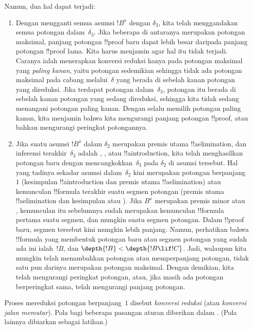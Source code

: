 \documentclass[../../../include/open-logic-section]{subfiles}
\begin{document}
Namun, dua hal dapat terjadi:
\begin{enumerate}
  \item Dengan mengganti semua asumsi $!B^x$ dengan $\delta_3$, kita telah
  menggandakan semua potongan dalam~$\delta_3$. Jika beberapa di antaranya
  merupakan potongan maksimal, panjang potongan !!{proof} baru dapat lebih
  besar daripada panjang potongan !!{proof} lama. Kita harus menjamin agar
  hal itu tidak terjadi. Caranya ialah menerapkan konversi reduksi hanya pada
  potongan maksimal yang \emph{paling kanan}, yaitu potongan sedemikian
  sehingga tidak ada potongan maksimal pada cabang melalui~$\delta$ yang
  berada di sebelah kanan potongan yang direduksi. Jika terdapat potongan
  dalam~$\delta_3$, potongan itu berada di sebelah kanan potongan yang sedang
  direduksi, sehingga kita tidak sedang menangani potongan paling kanan.
  Dengan selalu memilih potongan paling kanan, kita menjamin bahwa kita
  mengurangi panjang potongan !!{proof}, atau bahkan mengurangi peringkat
  potongannya.
  \item Jika suatu asumsi $!B^x$ dalam $\delta_2$ merupakan premis utama
  !!a{elimination}, dan inferensi terakhir~$\delta_3$ adalah \Elim{\lor},
  \Elim{\lexists}, atau !!a{introduction}, kita telah menghasilkan potongan
  baru dengan mencangkokkan~$\delta_3$ pada $\delta_2$ di asumsi tersebut.
  Hal yang tadinya sekadar asumsi dalam~$\delta_2$ kini merupakan potongan
  berpanjang~$1$ (kesimpulan !!a{introduction} dan premis utama
  !!a{elimination}) atau kemunculan !!{formula} terakhir suatu segmen
  potongan (premis utama !!a{elimination} dan kesimpulan \Elim{\lor} atau
  \Elim{\lexists}). Jika $B^x$ merupakan premis minor \Elim{\lor} atau
  \Elim{\lexists}, kemunculan itu sebelumnya sudah merupakan kemunculan
  !!{formula} pertama suatu segmen, dan mungkin suatu segmen potongan. Dalam
  !!{proof} baru, segmen tersebut kini mungkin lebih panjang. Namun,
  perhatikan bahwa !!{formula} yang membentuk potongan baru atau segmen
  potongan yang sudah ada ini ialah~$!B$, dan
  $\depth{!B} < \depth{!B \lif !C}$. Jadi, walaupun kita mungkin telah
  menambahkan potongan atau memperpanjang potongan, tidak satu pun darinya
  merupakan potongan maksimal. Dengan demikian, kita telah mengurangi
  peringkat potongan, atau, jika masih ada potongan berperingkat sama, telah
  mengurangi panjang potongan.
\end{enumerate}

Proses mereduksi potongan berpanjang~$1$ disebut \emph{konversi reduksi}
(atau \emph{konversi jalan memutar}). Pola bagi beberapa pasangan aturan
diberikan dalam . (Pola lainnya dibiarkan
sebagai latihan.)
\end{document}
